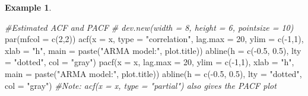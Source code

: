 \documentclass[
]{book}
\newenvironment{Shaded}{\begin{snugshade}}{\end{snugshade}}
\newcommand{\AttributeTok}[1]{\textcolor[rgb]{0.77,0.63,0.00}{#1}}
\newcommand{\CommentTok}[1]{\textcolor[rgb]{0.56,0.35,0.01}{\textit{#1}}}
\newcommand{\DecValTok}[1]{\textcolor[rgb]{0.00,0.00,0.81}{#1}}
\newcommand{\FloatTok}[1]{\textcolor[rgb]{0.00,0.00,0.81}{#1}}
\newcommand{\FunctionTok}[1]{\textcolor[rgb]{0.00,0.00,0.00}{#1}}
\newcommand{\NormalTok}[1]{#1}
\newcommand{\SpecialCharTok}[1]{\textcolor[rgb]{0.00,0.00,0.00}{#1}}
\newcommand{\StringTok}[1]{\textcolor[rgb]{0.31,0.60,0.02}{#1}}
\theoremstyle{definition}
\theoremstyle{definition}
\newtheorem{example}{Example}[chapter]
\theoremstyle{definition}
\theoremstyle{definition}
\theoremstyle{remark}
\begin{document}
\begin{example}
\begin{Shaded}
\begin{Highlighting}[]
  \CommentTok{\#Estimated ACF and PACF}
  \CommentTok{\# dev.new(width = 8, height = 6, pointsize = 10)}
  \FunctionTok{par}\NormalTok{(}\AttributeTok{mfcol =} \FunctionTok{c}\NormalTok{(}\DecValTok{2}\NormalTok{,}\DecValTok{2}\NormalTok{))}
  \FunctionTok{acf}\NormalTok{(}\AttributeTok{x =}\NormalTok{ x, }\AttributeTok{type =} \StringTok{"correlation"}\NormalTok{, }\AttributeTok{lag.max =} \DecValTok{20}\NormalTok{, }\AttributeTok{ylim =} \FunctionTok{c}\NormalTok{(}\SpecialCharTok{{-}}\DecValTok{1}\NormalTok{,}\DecValTok{1}\NormalTok{), }\AttributeTok{xlab =} \StringTok{"h"}\NormalTok{,}
    \AttributeTok{main =} \FunctionTok{paste}\NormalTok{(}\StringTok{"ARMA model:"}\NormalTok{, plot.title))}
  \FunctionTok{abline}\NormalTok{(}\AttributeTok{h =} \FunctionTok{c}\NormalTok{(}\SpecialCharTok{{-}}\FloatTok{0.5}\NormalTok{, }\FloatTok{0.5}\NormalTok{), }\AttributeTok{lty =} \StringTok{"dotted"}\NormalTok{, }\AttributeTok{col =} \StringTok{"gray"}\NormalTok{)}
  \FunctionTok{pacf}\NormalTok{(}\AttributeTok{x =}\NormalTok{ x, }\AttributeTok{lag.max =} \DecValTok{20}\NormalTok{, }\AttributeTok{ylim =} \FunctionTok{c}\NormalTok{(}\SpecialCharTok{{-}}\DecValTok{1}\NormalTok{,}\DecValTok{1}\NormalTok{), }\AttributeTok{xlab =} \StringTok{"h"}\NormalTok{,}
    \AttributeTok{main =} \FunctionTok{paste}\NormalTok{(}\StringTok{"ARMA model:"}\NormalTok{, plot.title))}
  \FunctionTok{abline}\NormalTok{(}\AttributeTok{h =} \FunctionTok{c}\NormalTok{(}\SpecialCharTok{{-}}\FloatTok{0.5}\NormalTok{, }\FloatTok{0.5}\NormalTok{), }\AttributeTok{lty =} \StringTok{"dotted"}\NormalTok{, }\AttributeTok{col =} \StringTok{"gray"}\NormalTok{)}
  \CommentTok{\#Note: acf(x = x, type = "partial") also gives the PACF plot}
  

\end{Highlighting}
\end{Shaded}
\end{example}
\end{document}
